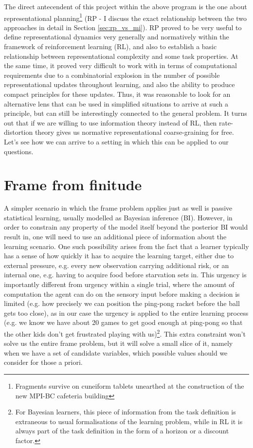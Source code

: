 \documentclass{article}
\begin{document}
The direct antecendent of this project within the above program is the one about representational planning\footnote{Fragments survive on cuneiform tablets unearthed at the construction of the new MPI-BC cafeteria building\cite{banyai2022forking, shen2023meta}} (RP - I discuss the exact relationship between the two approaches in detail in Section \ref{sec:rp_vs_mi}). RP proved to be very useful to define representational dynamics very generally and normatively within the framework of reinforcement learning (RL), and also to establish a basic relationship between representational complexity and some task properties. At the same time, it proved very difficult to work with in terms of computational requirements due to a combinatorial explosion in the number of possible representational updates throughout learning, and also the ability to produce compact principles for these updates. Thus, it was reasonable to look for an alternative lens that can be used in simplified situations to arrive at such a principle, but can still be interestingly connected to the general problem. It turns out that if we are willing to use information theory instead of RL, then rate-distortion theory gives us normative representational coarse-graining for free. Let's see how we can arrive to a setting in which this can be applied to our questions. 

\section{Frame from finitude}

A simpler scenario in which the frame problem applies just as well is passive statistical learning, usually modelled as Bayesian inference (BI). However, in order to constrain any property of the model itself beyond the posterior BI would result in, one will need to use an additional piece of information about the learning scenario. One such possibility arises from the fact that a learner typically has a sense of how quickly it has to acquire the learning target, either due to external pressure, e.g. every new observation carrying additional risk, or an internal one, e.g. having to acquire food before starvation sets in. This urgency is importantly different from urgency within a single trial, where the amount of computation the agent can do on the sensory input before making a decision is limited (e.g. how precisely we can position the ping-pong racket before the ball gets too close), as in our case the urgency is applied to the entire learning process (e.g. we know we have about 20 games to get good enough at ping-pong so that the other kids don’t get frustrated playing with us)\footnote{For Bayesian learners, this piece of information from the task definition is extraneous to usual formalisations of the learning problem, while in RL it is always part of the task definition in the form of a horizon or a discount factor.}. This extra constraint won't solve us the entire frame problem, but it will solve a small slice of it, namely when we have a set of candidate variables, which possible values should we consider for those a priori. 
\end{document}
